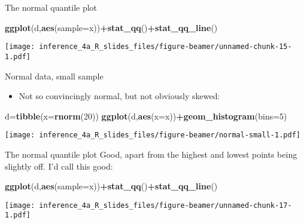 \documentclass[
  ignorenonframetext,
]{beamer}
\newenvironment{Shaded}{\begin{snugshade}}{\end{snugshade}}
\newcommand{\DataTypeTok}[1]{\textcolor[rgb]{0.13,0.29,0.53}{#1}}
\newcommand{\DecValTok}[1]{\textcolor[rgb]{0.00,0.00,0.81}{#1}}
\newcommand{\KeywordTok}[1]{\textcolor[rgb]{0.13,0.29,0.53}{\textbf{#1}}}
\newcommand{\NormalTok}[1]{#1}
\newcommand{\OperatorTok}[1]{\textcolor[rgb]{0.81,0.36,0.00}{\textbf{#1}}}
\providecommand{\tightlist}{%
  \setlength{\itemsep}{0pt}\setlength{\parskip}{0pt}}
\begin{document}
\begin{frame}[fragile]{The normal quantile plot}
\protect\hypertarget{the-normal-quantile-plot}{}
\begin{Shaded}
\begin{Highlighting}[]
\KeywordTok{ggplot}\NormalTok{(d,}\KeywordTok{aes}\NormalTok{(}\DataTypeTok{sample=}\NormalTok{x))}\OperatorTok{+}\KeywordTok{stat\_qq}\NormalTok{()}\OperatorTok{+}\KeywordTok{stat\_qq\_line}\NormalTok{()}
\end{Highlighting}
\end{Shaded}

\texttt{[image: inference\_4a\_R\_slides\_files/figure-beamer/unnamed-chunk-15-1.pdf]}
\end{frame}

\begin{frame}[fragile]{Normal data, small sample}
\protect\hypertarget{normal-data-small-sample}{}
\begin{itemize}
\tightlist
\item
  Not so convincingly normal, but not obviously skewed:
\end{itemize}

\begin{Shaded}
\begin{Highlighting}[]
\NormalTok{d=}\KeywordTok{tibble}\NormalTok{(}\DataTypeTok{x=}\KeywordTok{rnorm}\NormalTok{(}\DecValTok{20}\NormalTok{))}
\KeywordTok{ggplot}\NormalTok{(d,}\KeywordTok{aes}\NormalTok{(}\DataTypeTok{x=}\NormalTok{x))}\OperatorTok{+}\KeywordTok{geom\_histogram}\NormalTok{(}\DataTypeTok{bins=}\DecValTok{5}\NormalTok{)}
\end{Highlighting}
\end{Shaded}

\texttt{[image: inference\_4a\_R\_slides\_files/figure-beamer/normal-small-1.pdf]}
\end{frame}

\begin{frame}[fragile]{The normal quantile plot}
\protect\hypertarget{the-normal-quantile-plot-1}{}
Good, apart from the highest and lowest points being slightly off. I'd
call this good:

\begin{Shaded}
\begin{Highlighting}[]
\KeywordTok{ggplot}\NormalTok{(d,}\KeywordTok{aes}\NormalTok{(}\DataTypeTok{sample=}\NormalTok{x))}\OperatorTok{+}\KeywordTok{stat\_qq}\NormalTok{()}\OperatorTok{+}\KeywordTok{stat\_qq\_line}\NormalTok{()}
\end{Highlighting}
\end{Shaded}

\texttt{[image: inference\_4a\_R\_slides\_files/figure-beamer/unnamed-chunk-17-1.pdf]}
\end{frame}
\end{document}

